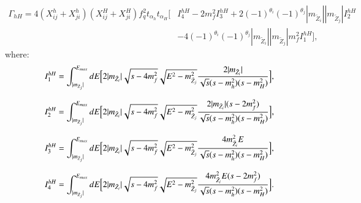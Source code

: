 \documentclass[final,3p,times]{elsarticle}
\begin{document}
\begin{equation}
\begin{aligned}
\Gamma_{hH} = 4(X_{ij}^h + X_{ji}^h)(X_{ij}^H + X_{ji}^H)f_{q}^2 t_{\alpha_h} t_{\alpha_H} \Big[ & I_{4}^{hH} - 2m_{f}^2I_{3}^{hH} + 2(-1)^{\theta_i}(-1)^{\theta_j}|m_{\tilde{Z}_i}||m_{\tilde{Z}_j}|I_{2}^{hH} \\ & - 4(-1)^{\theta_i}(-1)^{\theta_j}|m_{\tilde{Z}_i}||m_{\tilde{Z}_j}|m_{f}^2 I_{1}^{hH} \Big],
\end{aligned}
\end{equation}
where:
\begin{equation}
I_{1}^{hH} = \int_{|m_{\tilde{Z}_j}|}^{E_{max}} dE \Big[2|m_{\tilde{Z}_i}|\sqrt{s-4m_{f}^2}\sqrt{E^2 - m_{\tilde{Z}_j}^2} {2|m_{\tilde{Z}_i}| \over \sqrt{s}(s-m_{h}^2)(s-m_{H}^2)}\Big],
\end{equation}

\begin{equation}
I_{2}^{hH} = \int_{|m_{\tilde{Z}_j}|}^{E_{max}} dE \Big[2|m_{\tilde{Z}_i}|\sqrt{s-4m_{f}^2}\sqrt{E^2 - m_{\tilde{Z}_j}^2} {2|m_{\tilde{Z}_i}| (s-2m_{f}^2) \over \sqrt{s}(s-m_{h}^2)(s-m_{H}^2)}\Big],
\end{equation}

\begin{equation}
I_{3}^{hH} = \int_{|m_{\tilde{Z}_j}|}^{E_{max}} dE \Big[2|m_{\tilde{Z}_i}|\sqrt{s-4m_{f}^2}\sqrt{E^2 - m_{\tilde{Z}_j}^2} {4m_{\tilde{Z}_i}^2 E \over \sqrt{s}(s-m_{h}^2)(s-m_{H}^2)}\Big],
\end{equation}

\begin{equation}
I_{4}^{hH} = \int_{|m_{\tilde{Z}_j}|}^{E_{max}} dE \Big[2|m_{\tilde{Z}_i}|\sqrt{s-4m_{f}^2}\sqrt{E^2 - m_{\tilde{Z}_j}^2} {4m_{\tilde{Z}_i}^2 E (s-2m_{f}^2) \over \sqrt{s}(s-m_{h}^2)(s-m_{H}^2)}\Big].	
\end{equation}
\end{document}
